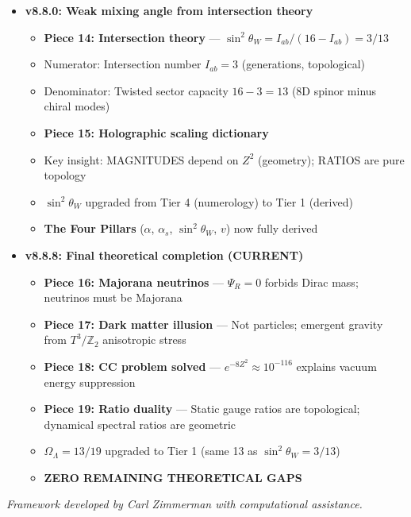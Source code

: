 \documentclass[12pt,a4paper]{article}
\newcommand{\Ztwo}{\mathbb{Z}_2}
\newcommand{\Tthree}{T^3}
\newcommand{\sinW}{\sin^2\theta_W}
\newcommand{\Zsq}{Z^2}
\begin{document}
\begin{itemize}[itemsep=0pt]
\begin{itemize}[itemsep=0pt]
        \item The Three Pillars ($\alpha$, $\alpha_s$, $v$) fully derived from $\Zsq = 32\pi/3$
    \end{itemize}
    \item \textbf{v8.8.0: Weak mixing angle from intersection theory}
    \begin{itemize}[itemsep=0pt]
        \item \textbf{Piece 14: Intersection theory} --- $\sinW = I_{ab}/(16 - I_{ab}) = 3/13$
        \item Numerator: Intersection number $I_{ab} = 3$ (generations, topological)
        \item Denominator: Twisted sector capacity $16 - 3 = 13$ (8D spinor minus chiral modes)
        \item \textbf{Piece 15: Holographic scaling dictionary}
        \item Key insight: MAGNITUDES depend on $\Zsq$ (geometry); RATIOS are pure topology
        \item $\sinW$ upgraded from Tier 4 (numerology) to Tier 1 (derived)
        \item \textbf{The Four Pillars} ($\alpha$, $\alpha_s$, $\sinW$, $v$) now fully derived
    \end{itemize}
    \item \textbf{v8.8.8: Final theoretical completion (CURRENT)}
    \begin{itemize}[itemsep=0pt]
        \item \textbf{Piece 16: Majorana neutrinos} --- $\Psi_R = 0$ forbids Dirac mass; neutrinos must be Majorana
        \item \textbf{Piece 17: Dark matter illusion} --- Not particles; emergent gravity from $\Tthree/\Ztwo$ anisotropic stress
        \item \textbf{Piece 18: CC problem solved} --- $e^{-8\Zsq} \approx 10^{-116}$ explains vacuum energy suppression
        \item \textbf{Piece 19: Ratio duality} --- Static gauge ratios are topological; dynamical spectral ratios are geometric
        \item $\Omega_\Lambda = 13/19$ upgraded to Tier 1 (same 13 as $\sinW = 3/13$)
        \item \textbf{ZERO REMAINING THEORETICAL GAPS}
    \end{itemize}
\end{itemize}

\vspace{1em}
\textit{Framework developed by Carl Zimmerman with computational assistance.}
\end{document}
